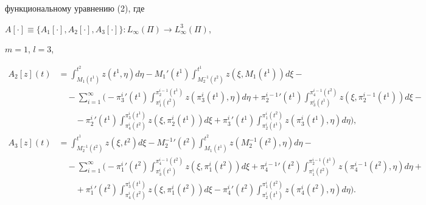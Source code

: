 функциональному уравнению (2), где


$A[\cdot]\equiv\{A_1[\cdot],A_2[\cdot],A_3[\cdot]\}:


L_\infty(\Pi)\longrightarrow L^3_\infty(\Pi)$,


$m=1$, $l=3$,


\begin{align*}


A_2[z](t)&=\int^{t^2}_{M_1(t^1)}z(t^1,\eta)d\eta-


{M_1}'(t^1)\int^{t^1}_{M^{-1}_2(t^2)}z(\xi,M_1(t^1))d\xi-\\


%


&\quad-\sum^{\infty}_{i=1}\bigg(-{{\pi}^i_3}{}'(t^1)


\int^{{\pi}^{i-1}_2(t^1)}_{{\pi}^i_1(t^2)}z({\pi}^i_3(t^1),\eta)d\eta+


{{\pi}^{i-1}_2}{}'(t^1)\int^{{\pi}^{i-1}_4(t^2)}_{{\pi}^i_3(t^1)}


z(\xi,{\pi}^{i-1}_2(t^1))d\xi- \\


%


&\qquad -{{\pi}^i_2}{}'(t^1)


\int^{{\pi}^i_3(t^1)}_{{\pi}^i_4(t^2)}z(\xi,{\pi}^i_2(t^1))d\xi+


{{\pi}^i_3}{}'(t^1)\int^{{\pi}^i_1(t^2)}_{{\pi}^i_2(t^1)}


z({\pi}^i_3(t^1),\eta)d\eta \bigg), \\


%


A_3[z](t)&=\int^{t^1}_{M^{-1}_2(t^2)}z(\xi,t^2)d\xi-


{M^{-1}_2}{}'(t^2)\int^{t^2}_{M_1(t^1)}z(M^{-1}_2(t^2),\eta)d\eta-\\


%


&\quad-\sum^{\infty}_{i=1}\bigg( -{{\pi}^i_1}{}'(t^2)


\int^{{\pi}^{i-1}_4(t^2)}_{{\pi}^i_3(t^1)}z(\xi,{\pi}^i_1(t^2))d\xi+


{{\pi}^{i-1}_4}{}'(t^2)\int^{{\pi}^{i-1}_2(t^1)}_{{\pi}^i_1(t^2)}


z({\pi}^{i-1}_4(t^2),\eta)d\eta+ \\


%


&\qquad +{{\pi}^i_1}'{}(t^2)


\int^{{\pi}^i_3(t^1)}_{{\pi}^i_4(t^2)}z(\xi,{\pi}^i_1(t^2))d\xi-


{{\pi}^i_4}{}'(t^2)\int^{{\pi}^i_1(t^2)}_{{\pi}^i_2(t^1)}


z({\pi}^i_4(t^2),\eta)d\eta \bigg).


\end{align*}


